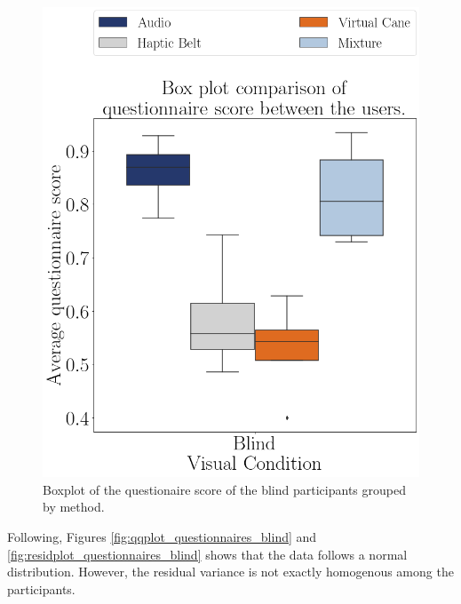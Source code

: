 \begin{figure}[!htb]
    \centering
    \includegraphics[width = 0.6\linewidth]{Resultados/Questionario/Figuras/png/boxplot_questionnaire_scene_blind.png}
    \caption{Boxplot of the questionaire score of the blind participants grouped by method.}
    \label{fig:boxplot_quest_blind_scene}
\end{figure}

%
%

Following, Figures \ref{fig:qqplot_questionnaires_blind} and \ref{fig:residplot_questionnaires_blind} shows that the data follows a normal distribution. However, the residual variance is not exactly homogenous among the participants. 

